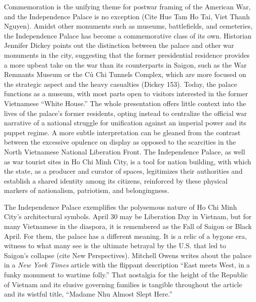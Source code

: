 \vi Commemoration is the unifying theme for postwar framing of the American War, and the Independence Palace is no exception (Cite Hue Tam Ho Tai, Viet Thanh Nguyen). Amidst other monuments such as museums, battlefields, and cemeteries, the Independence Palace has become a commemorative class of its own. Historian Jennifer Dickey points out the distinction between the palace and other war monuments in the city, suggesting that the former presidential residence provides a more upbeat take on the war than its counterparts in Saigon, such as the War Remnants Museum or the Củ Chi Tunnels Complex, which are more focused on the strategic aspect and the heavy casualties (Dickey 153). Today, the palace functions as a museum, with most parts open to visitors interested in the former Vietnamese “White House.” The whole presentation offers little context into the lives of the palace’s former residents, opting instead to centralize the official war narrative of a national struggle for unification against an imperial power and its puppet regime. A more subtle interpretation can be gleaned from the contrast between the excessive opulence on display as opposed to the scarcities in the North Vietnamese National Liberation Front. The Independence Palace, as well as war tourist sites in Ho Chi Minh City, is a tool for nation building, with which the state, as a producer and curator of spaces, legitimizes their authorities and establish a shared identity among its citizens, reinforced by these physical markers of nationalism, patriotism, and belongingness.

The Independence Palace exemplifies the polysemous nature of Ho Chi Minh City’s architectural symbols. April 30 may be Liberation Day in Vietnam, but for many Vietnamese in the diaspora, it is remembered as the Fall of Saigon or Black April.  For them, the palace has a different meaning. It is a relic of a bygone era, witness to what many see is the ultimate betrayal by the U.S. that led to Saigon’s collapse (cite New Perspectives). Mitchell Owens writes about the palace in a \textit{New York Times} article with the flippant description “East meets West, in a funky monument to wartime folly.” That nostalgia for the height of the Republic of Vietnam and its elusive governing families is tangible throughout the article and its wistful title, “Madame Nhu Almost Slept Here.” %

